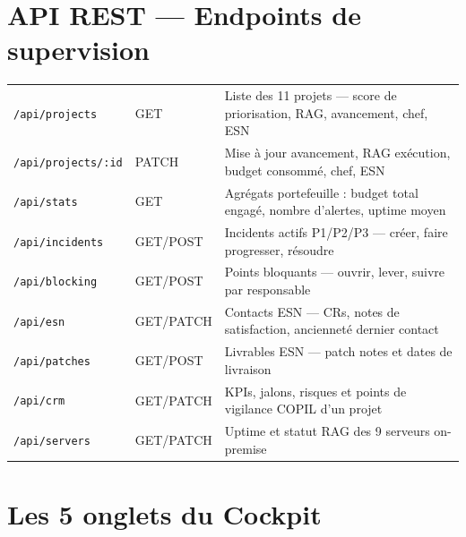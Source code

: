 \documentclass[11pt,a4paper,oneside]{report}
\begin{document}
\section{API REST --- Endpoints de supervision}

\vspace{4pt}
\begin{center}
\renewcommand{\arraystretch}{1.5}
\begin{tabularx}{\textwidth}{L{4cm} C{2cm} L{8cm}}
\toprule
{}
 &  &  \\
\midrule
\texttt{/api/projects}       & GET   & Liste des 11 projets --- score de priorisation, RAG, avancement, chef, ESN \\
\texttt{/api/projects/:id}   & PATCH & Mise à jour avancement, RAG exécution, budget consommé, chef, ESN \\
\texttt{/api/stats}          & GET   & Agrégats portefeuille : budget total engagé, nombre d'alertes, uptime moyen \\
\texttt{/api/incidents}      & GET/POST & Incidents actifs P1/P2/P3 --- créer, faire progresser, résoudre \\
\texttt{/api/blocking}       & GET/POST & Points bloquants --- ouvrir, lever, suivre par responsable \\
\texttt{/api/esn}            & GET/PATCH & Contacts ESN --- CRs, notes de satisfaction, ancienneté dernier contact \\
\texttt{/api/patches}        & GET/POST & Livrables ESN --- patch notes et dates de livraison \\
\texttt{/api/crm}            & GET/PATCH & KPIs, jalons, risques et points de vigilance COPIL d'un projet \\
\texttt{/api/servers}        & GET/PATCH & Uptime et statut RAG des 9 serveurs on-premise \\
\bottomrule
\end{tabularx}
\end{center}

\section{Les 5 onglets du Cockpit}
\end{document}
